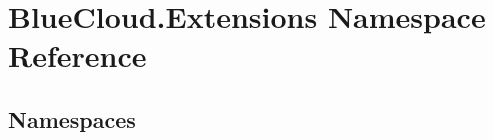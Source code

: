 \hypertarget{namespace_blue_cloud_1_1_extensions}{}\section{Blue\+Cloud.\+Extensions Namespace Reference}
\label{namespace_blue_cloud_1_1_extensions}
\subsection*{Namespaces}
\begin{DoxyCompactItemize}
\end{DoxyCompactItemize}
